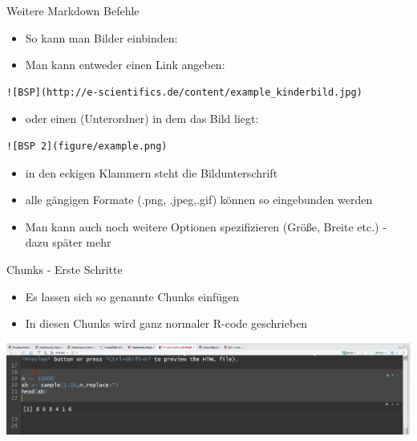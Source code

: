 \documentclass[ignorenonframetext,]{beamer}
\providecommand{\tightlist}{%
\setlength{\itemsep}{0pt}\setlength{\parskip}{0pt}}
\begin{document}
\begin{frame}[fragile]{Weitere Markdown Befehle}

\begin{itemize}
\tightlist
\item
  So kann man Bilder einbinden:
\item
  Man kann entweder einen Link angeben:
\end{itemize}

\begin{verbatim}
![BSP](http://e-scientifics.de/content/example_kinderbild.jpg)
\end{verbatim}

\begin{itemize}
\tightlist
\item
  oder einen (Unterordner) in dem das Bild liegt:
\end{itemize}

\begin{verbatim}
![BSP 2](figure/example.png)
\end{verbatim}

\begin{itemize}
\tightlist
\item
  in den eckigen Klammern steht die Bildunterschrift
\item
  alle gängigen Formate (.png, .jpeg,.gif) können so eingebunden werden
\item
  Man kann auch noch weitere Optionen spezifizieren (Größe, Breite etc.)
  - dazu später mehr
\end{itemize}

\end{frame}

\begin{frame}{Chunks - Erste Schritte}

\begin{itemize}
\tightlist
\item
  Es lassen sich so genannte Chunks einfügen
\item
  In diesen Chunks wird ganz normaler R-code geschrieben
\end{itemize}

\includegraphics{./tex2pdf.956/973493b0437dbf133e9907d00ce10ce2f82855fb.png}

\end{frame}
\end{document}
